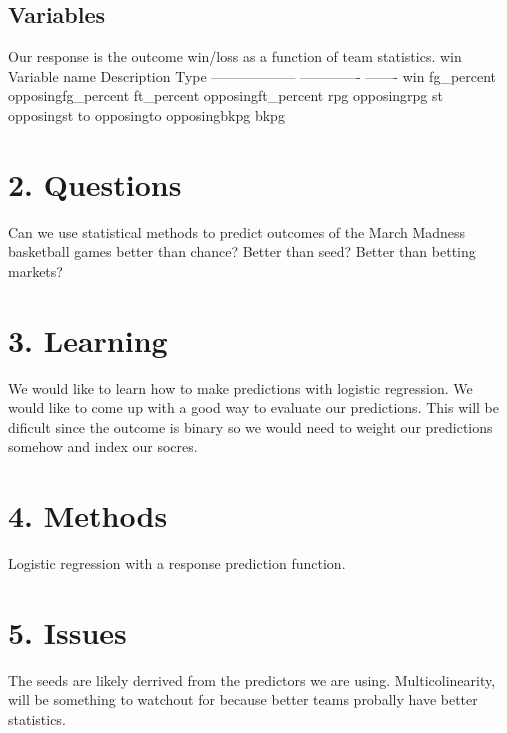 \documentclass[11pt,]{article}
\begin{document}
\hypertarget{variables}{%
\subsection{Variables}\label{variables}}

Our response is the outcome win/loss as a function of team statistics.
win \textbar{} Variable name \textbar{} Description \textbar{} Type
\textbar{} \textbar{} ------------------ \textbar{} -------------
\textbar{} ------- \textbar{} \textbar{} win \textbar{} \textbar{}
\textbar{} \textbar{} fg\_percent \textbar{} \textbar{} \textbar{}
\textbar{} opposingfg\_percent \textbar{} \textbar{} \textbar{}
\textbar{} ft\_percent \textbar{} \textbar{} \textbar{} \textbar{}
opposingft\_percent \textbar{} \textbar{} \textbar{} \textbar{} rpg
\textbar{} \textbar{} \textbar{} \textbar{} opposingrpg \textbar{}
\textbar{} \textbar{} \textbar{} st \textbar{} \textbar{} \textbar{}
\textbar{} opposingst \textbar{} \textbar{} \textbar{} \textbar{} to
\textbar{} \textbar{} \textbar{} \textbar{} opposingto \textbar{}
\textbar{} \textbar{} \textbar{} opposingbkpg \textbar{} \textbar{}
\textbar{} \textbar{} bkpg \textbar{} \textbar{} \textbar{}

\hypertarget{questions}{%
\section{2. Questions}\label{questions}}

Can we use statistical methods to predict outcomes of the March Madness
basketball games better than chance? Better than seed? Better than
betting markets?

\hypertarget{learning}{%
\section{3. Learning}\label{learning}}

We would like to learn how to make predictions with logistic regression.
We would like to come up with a good way to evaluate our predictions.
This will be dificult since the outcome is binary so we would need to
weight our predictions somehow and index our socres.

\hypertarget{methods}{%
\section{4. Methods}\label{methods}}

Logistic regression with a response prediction function.

\hypertarget{issues}{%
\section{5. Issues}\label{issues}}

The seeds are likely derrived from the predictors we are using.
Multicolinearity, will be something to watchout for because better teams
probally have better statistics.





\newpage
\singlespacing
\end{document}

